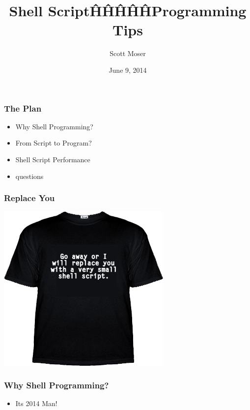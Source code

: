 \documentclass{beamer}
\author{Scott Moser}
\title{Shell Script\^H\^H\^H\^H\^HProgramming Tips}
\institute{Michigan!/usr/group}
\date{June 9, 2014}
\begin{document}
\begin{frame}[t,plain]
    \titlepage
\end{frame}

\begin{frame}
   \frametitle{The Plan}
   \begin{itemize}
      \item Why Shell Programming?
      \item From Script to Program?
      \item Shell Script Performance
      \item questions
   \end{itemize}
\end{frame}

\begin{frame}
   \frametitle{Replace You}
   \includegraphics{replace-you}
\end{frame}

\begin{frame}
   \frametitle{Why Shell Programming?}
   \begin{itemize}
      \item Its 2014 Man!
    \end{itemize}
\end{frame}
\end{document}

